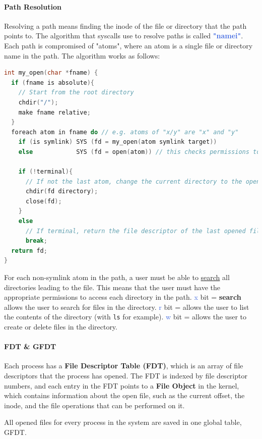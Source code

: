 \documentclass[openany,12pt]{book}
\newcommand{\code}[1]{\texttt{#1}}
\newcommand{\blue}[1]{\textcolor{RoyalBlue}{#1}}
\begin{document}
\paragraph{Path Resolution} Resolving a path means finding the inode of the file or directory that the path points to. The algorithm that syscalls use to resolve paths is called \textbf{\blue{"namei"}}. Each path is compromised of "atoms", where an atom is a single file or directory name in the path. The algorithm works as follows:
\begin{lstlisting}[language=C, caption={Path Resolution Algorithm (namei)}, label={lst:namei}]
int my_open(char *fname) {
  if (fname is absolute){
    // Start from the root directory
    chdir("/");
    make fname relative;
  }
  foreach atom in fname do // e.g. atoms of "x/y" are "x" and "y"
    if (is symlink) SYS (fd = my_open(atom symlink target))
    else            SYS (fd = open(atom)) // this checks permissions too

    if (!terminal){
      // If not the last atom, change the current directory to the opened one
      chdir(fd directory);
      close(fd);
    }
    else
      // If terminal, return the file descriptor of the last opened file
      break;
  return fd;
}
\end{lstlisting}

For each non-symlink atom in the path, a user must be able to \ul{search} all directories leading to the file. This means that the user must have the appropriate permissions to access each directory in the path. \blue{x} bit = \textbf{search} allows the user to search for files in the directory. \blue{r} bit = allows the user to list the contents of the directory (with \code{ls} for example). \blue{w} bit = allows the user to create or delete files in the directory.


\paragraph{FDT \& GFDT} Each process has a \textbf{File Descriptor Table (FDT)}, which is an array of file descriptors that the process has opened. The FDT is indexed by file descriptor numbers, and each entry in the FDT points to a \textbf{File Object} in the kernel, which contains information about the open file, such as the current offset, the inode, and the file operations that can be performed on it. 

All opened files for every process in the system are saved in one global table, GFDT.
\end{document}
